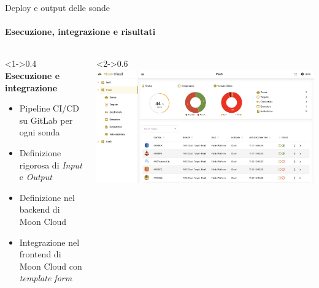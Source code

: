 \documentclass{beamer}
\begin{document}
\begin{frame}{Deploy e output delle sonde}
    \framesubtitle{Esecuzione, integrazione e risultati}
    \begin{columns}
        \begin{column}<1->{0.4\textwidth}
            \textbf{Esecuzione e integrazione}
            \begin{itemize}
                \item Pipeline CI/CD su GitLab per ogni sonda
                \item Definizione rigorosa di \emph{Input} e \emph{Output}
                \item Definizione nel backend di Moon Cloud
                \item Integrazione nel frontend di Moon Cloud con \emph{template form}
            \end{itemize}
        \end{column}
        \begin{column}<2->{0.6\textwidth}
            \includegraphics[width=\textwidth]{assets/paas.png}
        \end{column}
    \end{columns}
\end{frame}
\end{document}
